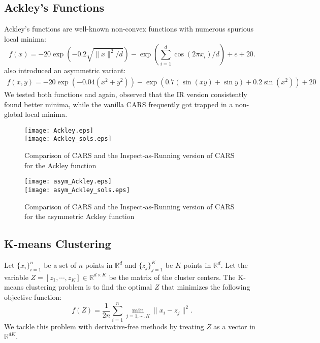 \subsection*{Ackley's Functions}
Ackley's functions are well-known non-convex functions with numerous spurious local minima:
\begin{equation*}
    f(x) = -20 \exp\left(-0.2 \sqrt{\|x\|^2/d}\right) - \exp\left(\sum_{i=1}^{d}{\cos(2\pi x_i)/d}\right) + e + 20.
\end{equation*}
 \cite{chen2019run} also introduced an asymmetric variant:
 \begin{align*}
    f(x,y) = -20 \exp(-0.04(x^2+y^2)) - \exp(0.7(\sin(xy) + \sin y) + 0.2\sin(x^2)) + 20
 \end{align*}
We tested both functions and again, observed that the IR version consistently found better minima, while the vanilla CARS frequently got trapped in a non-global local minima.
\begin{figure*}
    \centering
    {\texttt{[image: Ackley.eps]}}\\
    \vspace{3mm}
    {\texttt{[image: Ackley\_sols.eps]}}
    \caption{Comparison of CARS and the Inspect-as-Running version of CARS for the Ackley function}
    \label{fig: Ackley}
\end{figure*}

\begin{figure*}
    \centering
    {\texttt{[image: asym\_Ackley.eps]}}\\
    \vspace{3mm}
    {\texttt{[image: asym\_Ackley\_sols.eps]}}
    \caption{Comparison of CARS and the Inspect-as-Running version of CARS for the asymmetric Ackley function}
    \label{fig: Ackley asymmetric}
\end{figure*}

\subsection*{K-means Clustering}
Let $\{x_i\}_{i=1}^{n}$ be a set of $n$ points in $\mathbb{R}^d$ and $\{z_j\}_{j=1}^{K}$ be $K$ points in $\mathbb{R}^d$. Let the variable $Z = [z_1, \cdots, z_K] \in \mathbb{R}^{d \times K}$ be the matrix of the cluster centers. The K-means clustering problem is to find the optimal $Z$ that minimizes the following objective function:
\begin{equation*}
    f(Z) = \frac{1}{2n} \sum_{i=1}^{n} \min_{j=1,\cdots,K} \|x_i - z_j\|^2.
\end{equation*}
We tackle this problem with derivative-free methods by treating $Z$ as a vector in $\mathbb{R}^{dK}$.

